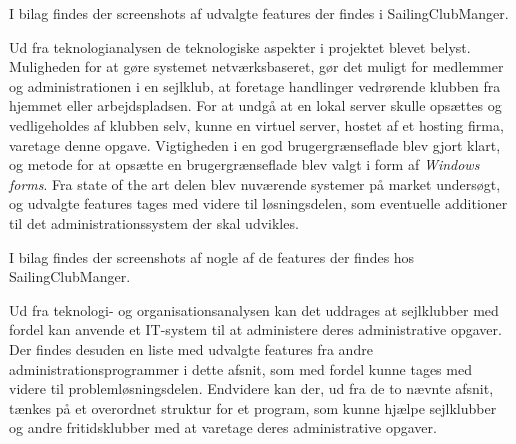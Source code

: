 I bilag  findes der screenshots af udvalgte features der findes i SailingClubManger.

Ud fra teknologianalysen de teknologiske aspekter i projektet blevet belyst. 
Muligheden for at gøre systemet netværksbaseret, gør det muligt for medlemmer og administrationen i en sejlklub, at foretage handlinger vedrørende klubben fra hjemmet eller arbejdspladsen. 
For at undgå at en lokal server skulle opsættes og vedligeholdes af klubben selv, kunne en virtuel server, hostet af et hosting firma, varetage denne opgave.
Vigtigheden i en god brugergrænseflade blev gjort klart, og metode for at opsætte en brugergrænseflade blev valgt i form af \textit{Windows forms}.
Fra state of the art delen blev nuværende systemer på market undersøgt, og udvalgte features tages med videre til løsningsdelen, som eventuelle additioner til det administrationssystem der skal udvikles.  

I bilag  findes der screenshots af nogle af de features der findes hos SailingClubManger.

Ud fra teknologi- og organisationsanalysen kan det uddrages at sejlklubber med fordel kan anvende et IT-system til at administere deres administrative opgaver. Der findes desuden en liste med udvalgte features fra andre administrationsprogrammer i dette afsnit, som med fordel kunne tages med videre til problemløsningsdelen. 
Endvidere kan der, ud fra de to nævnte afsnit, tænkes på et overordnet struktur for et program, som kunne hjælpe sejlklubber og andre fritidsklubber med at varetage deres administrative opgaver.  

